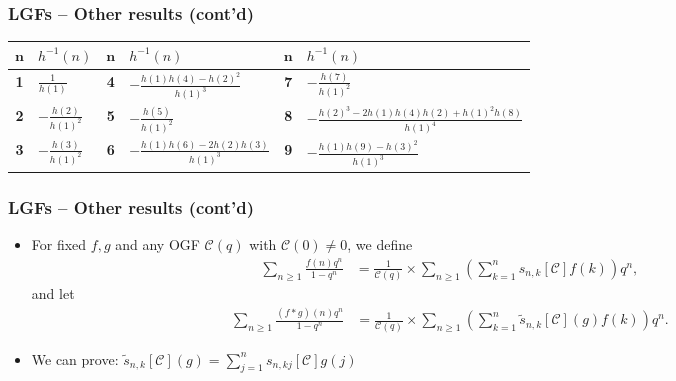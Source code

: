 \begin{frame}
\frametitle{LGFs -- Other results (cont'd)}

{\tiny
\begin{center}
\begin{tabular}{|c|l|c|l|c|l|} \hline 
$\mathbf{n}$ & $h^{-1}(n)$ & $\mathbf{n}$ & $h^{-1}(n)$ & $\mathbf{n}$ & $h^{-1}(n)$ \\ \hline 
\textbf{1} & $\displaystyle\frac{1}{h(1)}$ & \textbf{4} & $-\displaystyle\frac{h(1) h(4)-h(2)^2}{h(1)^3}$ & 
\textbf{7} & $-\displaystyle\frac{h(7)}{h(1)^2}$ \\ 
\textbf{2} & $-\displaystyle\frac{h(2)}{h(1)^2}$ & \textbf{5} & $-\displaystyle\frac{h(5)}{h(1)^2}$ & 
\textbf{8} & $-\displaystyle\frac{h(2)^3-2 h(1) h(4) h(2)+h(1)^2 h(8)}{h(1)^4}$ \\ 
\textbf{3} & $-\displaystyle\frac{h(3)}{h(1)^2}$ & \textbf{6} & $-\displaystyle\frac{h(1) h(6)-2 h(2) h(3)}{h(1)^3}$ & 
\textbf{9} & $-\displaystyle\frac{h(1) h(9)-h(3)^2}{h(1)^3}$ \\ \hline 
\end{tabular} 
\end{center} 
}

\end{frame}

\begin{frame}
\frametitle{LGFs -- Other results (cont'd)}
\begin{itemize} 

\item For fixed $f,g$ and any OGF $\mathcal{C}(q)$ with $\mathcal{C}(0) \neq 0$, we define 
      \begin{align*} 
      \tag{i}
      \sum_{n \geq 1} \frac{f(n) q^n}{1-q^n} & = \frac{1}{\mathcal{C}(q)} \times 
           \sum_{n \geq 1} \left(\sum_{k=1}^n 
           s_{n,k}[\mathcal{C}] f(k) \right) q^n, 
      \end{align*} 
      and let 
      \begin{align*} 
      \tag{ii} 
      \sum_{n \geq 1} \frac{(f \ast g)(n) q^n}{1-q^n} & = \frac{1}{\mathcal{C}(q)} \times 
            \sum_{n \geq 1} \left(\sum_{k=1}^n 
            \widetilde{s}_{n,k}[\mathcal{C}](g) f(k) \right) q^n. 
      \end{align*} 
\pause\item We can prove: $\widetilde{s}_{n,k}[\mathcal{C}](g) = \sum\limits_{j=1}^n s_{n,kj}[\mathcal{C}] g(j)$

\end{itemize}

\end{frame}

